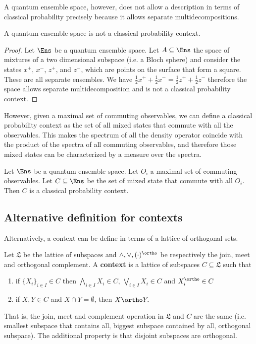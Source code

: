 A quantum ensemble space, however, does not allow a description in terms of classical probability precisely because it allows separate multidecompositions.

\begin{prop}
	A quantum ensemble space is not a classical probability context.
\end{prop}

\begin{proof}
	Let $\Ens$ be a quantum ensemble space. Let $A \subseteq \Ens$ the space of mixtures of a two dimensional subspace (i.e. a Bloch sphere) and consider the states $x^+$, $x^-$, $z^+$, and $z^-$, which are points on the surface that form a square. These are all separate ensembles. We have $\frac{1}{2} x^+ + \frac{1}{2} x^- = \frac{1}{2} z^+ + \frac{1}{2} z^-$ therefore the space allows separate multidecomposition and is not a classical probability context.
\end{proof}

However, given a maximal set of commuting observables, we can define a classical probability context as the set of all mixed states that commute with all the observables. This makes the spectrum of all the density operator coincide with the product of the spectra of all commuting observables, and therefore those mixed states can be characterized by a measure over the spectra.

\begin{conj}
	Let $\Ens$ be a quantum ensemble space. Let $O_i$ a maximal set of commuting observables. Let $C \subseteq \Ens$ be the set of mixed state that commute with all $O_i$. Then $C$ is a classical probability context.
\end{conj}


\subsection{Alternative definition for contexts}

Alternatively, a context can be define in terms of a lattice of orthogonal sets.

\begin{defn}
	Let $\mathfrak{L}$ be the lattice of subspaces and $\wedge, \vee, (\cdot)^\ortho$ be respectively the join, meet and orthogonal complement. A \textbf{context} is a lattice of subspaces $C \subseteq \mathfrak{L}$ such that
	\begin{enumerate}
		\item if $\{X_i\}_{i \in I} \in C$ then $\bigwedge_{i \in I} X_i \in C$, $\bigvee_{i \in I} X_i \in C$ and $X_i^\ortho \in C$
		\item if $X, Y \in C$ and $X \cap Y = \emptyset$, then $X \ortho Y.$
	\end{enumerate}
	That is, the join, meet and complement operation in $\mathfrak{L}$ and $C$ are the same (i.e. smallest subspace that contains all, biggest subspace contained by all, orthogonal subspace). The additional property is that disjoint subspaces are orthogonal.
\end{defn}

